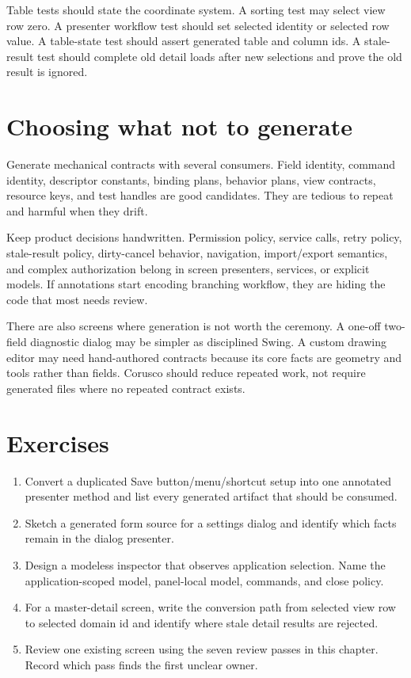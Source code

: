 Table tests should state the coordinate system. A sorting test may select view row zero. A presenter workflow test should set selected identity or selected row value. A table-state test should assert generated table and column ids. A stale-result test should complete old detail loads after new selections and prove the old result is ignored.

\section{Choosing what not to generate}

Generate mechanical contracts with several consumers. Field identity, command identity, descriptor constants, binding plans, behavior plans, view contracts, resource keys, and test handles are good candidates. They are tedious to repeat and harmful when they drift.

Keep product decisions handwritten. Permission policy, service calls, retry policy, stale-result policy, dirty-cancel behavior, navigation, import/export semantics, and complex authorization belong in screen presenters, services, or explicit models. If annotations start encoding branching workflow, they are hiding the code that most needs review.

There are also screens where generation is not worth the ceremony. A one-off two-field diagnostic dialog may be simpler as disciplined Swing. A custom drawing editor may need hand-authored contracts because its core facts are geometry and tools rather than fields. Corusco should reduce repeated work, not require generated files where no repeated contract exists.

\section{Exercises}

\begin{exercisebox}
\begin{enumerate}
\item Convert a duplicated Save button/menu/shortcut setup into one annotated presenter method and list every generated artifact that should be consumed.
\item Sketch a generated form source for a settings dialog and identify which facts remain in the dialog presenter.
\item Design a modeless inspector that observes application selection. Name the application-scoped model, panel-local model, commands, and close policy.
\item For a master-detail screen, write the conversion path from selected view row to selected domain id and identify where stale detail results are rejected.
\item Review one existing screen using the seven review passes in this chapter. Record which pass finds the first unclear owner.
\end{enumerate}
\end{exercisebox}
